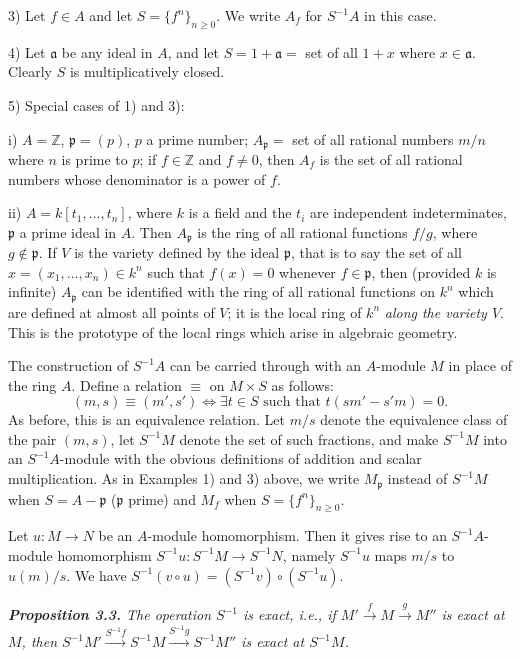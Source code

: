 3) Let $f\in A$ and let $S=\{f^n\}_{n\geq0}$.  We write $A_f$ for $S^{-1}A$ in this case.

4) Let $\mathfrak a$ be any ideal in $A$, and let $S=1+\mathfrak a={}$ set of all $1+x$ where
$x\in\mathfrak a$.  Clearly $S$ is multiplicatively closed.

5) Special cases of 1) and 3):

i) $A=\mathbb Z$, $\mathfrak p=(p)$, $p$ a prime number; $A_\mathfrak p={}$ set of all rational numbers
$m/n$ where $n$ is prime to $p$; if $f\in\mathbb Z$ and $f\ne0$, then $A_f$ is the set of all rational
numbers whose denominator is a power of $f$.

ii) $A=k[t_1,\ldots,t_n]$, where $k$ is a field and the $t_i$ are independent indeterminates, $\mathfrak p$ a prime ideal in $A$.  Then $A_\mathfrak p$ is the ring of all rational functions $f/g$,
where $g\notin\mathfrak p$.  If $V$ is the variety defined by the ideal $\mathfrak p$, that is to say the set of all
$x=(x_1,\ldots,x_n)\in k^n$ such that $f(x)=0$ whenever $f\in\mathfrak p$, then (provided $k$ is
infinite) $A_\mathfrak p$ can be identified with the ring of all rational functions on $k^n$ which
are defined at almost all points of $V$; it is the local ring of $k^n$ \emph{along the variety $V$}.
This is the prototype of the local rings which arise in algebraic geometry.

The construction of $S^{-1}A$ can be carried through with an $A$-module $M$ in
place of the ring $A$.  Define a relation $\equiv$ on $M\times S$ as follows:
\[
(m,s)\equiv(m',s')\Longleftrightarrow\exists t\in S\text{ such that }t(sm'-s'm)=0.
\]
As before, this is an equivalence relation.  Let $m/s$ denote the equivalence class
of the pair $(m,s)$, let $S^{-1}M$ denote the set of such fractions, and make $S^{-1}M$
into an $S^{-1}A$-module with the obvious definitions of addition and scalar
multiplication.  As in Examples 1) and 3) above, we write $M_\mathfrak p$ instead of $S^{-1}M$
when $S=A-\mathfrak p$ ($\mathfrak p$ prime) and $M_f$ when $S=\{f^n\}_{n\geq0}$.

Let $u:M\longrightarrow N$ be an $A$-module homomorphism.  Then it gives rise to an
$S^{-1}A$-module homomorphism $S^{-1}u:S^{-1}M\longrightarrow S^{-1}N$, namely $S^{-1}u$ maps $m/s$
to $u(m)/s$.  We have $S^{-1}(v\circ u)=(S^{-1}v)\circ(S^{-1}u)$.

\medskip
\noindent\textit{\textbf{Proposition 3.3.} The operation $S^{-1}$ is exact, i.e., if $M'\xrightarrow{f}M\xrightarrow{g}M''$ is
exact at $M$, then $S^{-1}M'\xrightarrow{S^{-1}f}S^{-1}M\xrightarrow{S^{-1}g}S^{-1}M''$ is exact at $S^{-1}M$.}

